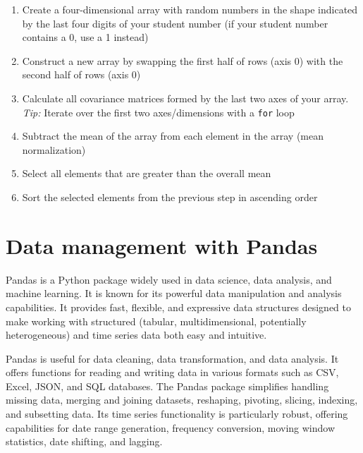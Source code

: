 

\begin{exerciseboxcomputer}
\begin{enumerate}
   \item Create a four-dimensional array with random numbers in the shape indicated by the last four digits of your student number (if your student number contains a 0, use a 1 instead)
   \item Construct a new array by swapping the first half of rows (axis 0) with the second half of rows (axis 0)
   \item Calculate all covariance matrices formed by the last two axes of your array. \emph{Tip:} Iterate over the first two axes/dimensions with a \texttt{for} loop
   \item Subtract the mean of the array from each element in the array (mean normalization)
   \item Select all elements that are greater than the overall mean
   \item Sort the selected elements from the previous step in ascending order
\end{enumerate}
\end{exerciseboxcomputer}

\section{Data management with Pandas}

Pandas is a Python package widely used in data science, data analysis, and machine learning. It is known for its powerful data manipulation and analysis capabilities. It provides fast, flexible, and expressive data structures designed to make working with structured (tabular, multidimensional, potentially heterogeneous) and time series data both easy and intuitive. 

Pandas is useful for data cleaning, data transformation, and data analysis. It offers functions for reading and writing data in various formats such as CSV, Excel, JSON, and SQL databases. The Pandas package simplifies handling missing data, merging and joining datasets, reshaping, pivoting, slicing, indexing, and subsetting data. Its time series functionality is particularly robust, offering capabilities for date range generation, frequency conversion, moving window statistics, date shifting, and lagging.

